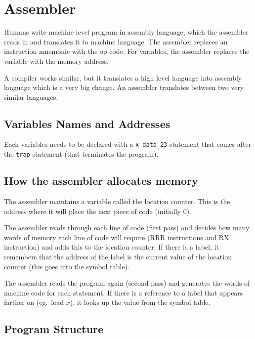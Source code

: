 \section{Assembler}\label{sec:assembler}

Humans write machine level program in assembly language, which the assembler reads in and translates it to machine language.
The assembler replaces an instruction mnemonic with the op code.
For variables, the assembler replaces the variable with the memory address.

A compiler works similar, but it translates a high level language into assembly language which is a very big change.
An assembler translates between two very similar languages.

\subsection{Variables Names and Addresses}\label{sub:variables_names_and_addresses}

Each variables needs to be declared with a \texttt{x data 23} statement that comes after the \texttt{trap} statement (that terminates the program).

\subsection{How the assembler allocates memory}\label{sub:how_the_assembler_allocates_memory}

The assembler maintains a variable called the location counter.
This is the address where it will place the next piece of code (initially \(0\)).

The assembler reads through each line of code (first pass) and decides how many words of memory each line of code will require (RRR instructions and RX instruction) and adds this to the location counter.
If there is a label, it remembers that the address of the label is the current value of the location counter (this goes into the symbol table).

The assembler reads the program again (second pass) and generates the words of machine code for each statement.
If there is a reference to a label that appears farther on (eg.\ load \(x\)), it looks up the value from the symbol table.

\subsection{Program Structure}\label{sub:program_structure}

